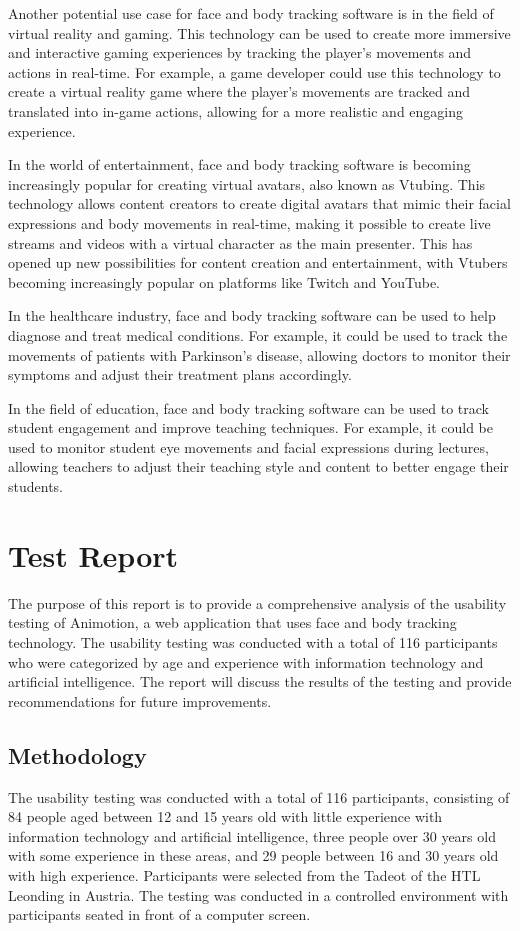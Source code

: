 Another potential use case for face and body tracking software is in the field of virtual reality and gaming. This 
technology can be used to create more immersive and interactive gaming experiences by tracking the player's movements 
and actions in real-time. For example, a game developer could use this technology to create a virtual reality game 
where the player's movements are tracked and translated into in-game actions, allowing for a more realistic and 
engaging experience.

In the world of entertainment, face and body tracking software is becoming increasingly popular for creating virtual 
avatars, also known as Vtubing. This technology allows content creators to create digital avatars that mimic their 
facial expressions and body movements in real-time, making it possible to create live streams and videos with a 
virtual character as the main presenter. This has opened up new possibilities for content creation and entertainment, 
with Vtubers becoming increasingly popular on platforms like Twitch and YouTube.

In the healthcare industry, face and body tracking software can be used to help diagnose and treat medical conditions. 
For example, it could be used to track the movements of patients with Parkinson's disease, allowing doctors to monitor 
their symptoms and adjust their treatment plans accordingly.

In the field of education, face and body tracking software can be used to track student engagement and improve teaching 
techniques. For example, it could be used to monitor student eye movements and facial expressions during lectures, allowing 
teachers to adjust their teaching style and content to better engage their students.

\section{Test Report}
The purpose of this report is to provide a comprehensive analysis of the usability testing of Animotion, a web application that uses face and 
body tracking technology. The usability testing was conducted with a total of 116 participants who were categorized by age and experience 
with information technology and artificial intelligence. The report will discuss the results of the testing and provide recommendations for future improvements.

\subsection{Methodology}
The usability testing was conducted with a total of 116 participants, consisting of 84 people aged between 12 and 15 years old with little experience 
with information technology and artificial intelligence, three people over 30 years old with some experience in these areas, and 29 people 
between 16 and 30 years old with high experience. Participants were selected from the Tadeot of the HTL Leonding in Austria. 
The testing was conducted in a controlled environment with participants seated in front of a computer screen.

